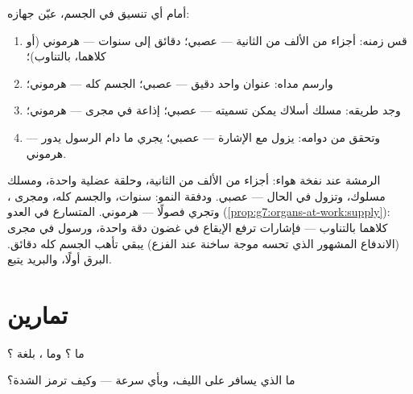 \begin{method}\label{met:g8:nervous-communication:diagnose}
أمام أي تنسيق في الجسم، عيّن جهازه:
\begin{enumerate}
  \item قس زمنه: أجزاء من الألف من الثانية --- عصبي؛
        دقائق إلى سنوات --- هرموني (أو كلاهما، بالتناوب)؛
  \item وارسم مداه: عنوان واحد دقيق --- عصبي؛ الجسم كله
        --- هرموني؛
  \item وجد طريقه: مسلك أسلاك يمكن تسميته --- عصبي؛
        إذاعة في مجرى  --- هرموني؛
  \item وتحقق من دوامه: يزول مع الإشارة --- عصبي؛ يجري
        ما دام الرسول يدور --- هرموني.
\end{enumerate}
\end{method}

\begin{example}\label{ex:g8:nervous-communication:cases}
الرمشة عند نفخة هواء: أجزاء من الألف من الثانية، وحلقة
عضلية واحدة، ومسلك مسلوك، وتزول في الحال --- عصبي. ودفقة
النمو: سنوات، والجسم كله، ومجرى ، وتجري فصولًا ---
هرموني.  المتسارع في العدو
(\cref{prop:g7:organs-at-work:supply}): كلاهما بالتناوب
--- فإشارات  ترفع الإيقاع في غضون دقة واحدة،
ورسول في مجرى  (الاندفاع المشهور الذي تحسه موجة
ساخنة عند الفزع) يبقي تأهب الجسم كله دقائق. البرق أولًا،
والبريد يتبع.
\end{example}

\section{تمارين}

\begin{exercise}[$\star$]\label{exo:g8:nervous-communication:1}
ما ؟ وما ، بلغة ؟
\end{exercise}

\begin{exercise}[$\star$]\label{exo:g8:nervous-communication:2}
ما الذي يسافر على الليف، وبأي سرعة --- وكيف ترمز
الشدة؟
\end{exercise}

